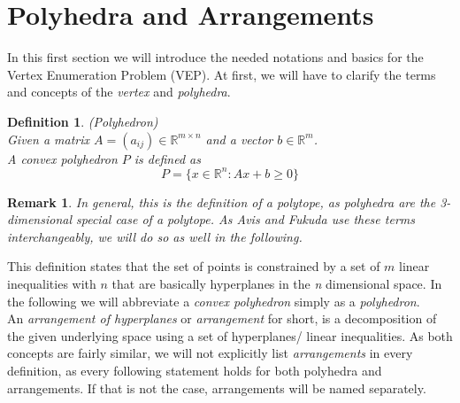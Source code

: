 \documentclass[a4paper, 11pt]{article}
\newtheorem{mydef}{Definition}
\newtheorem*{remark}{Remark}
\begin{document}
\section{Polyhedra and Arrangements}
In this first section we will introduce the needed notations and basics for the Vertex Enumeration Problem (VEP). At first, we will have to clarify the terms and concepts of the \textit{vertex} and \textit{polyhedra}.

\begin{mydef}(Polyhedron)\\
	Given a matrix $A=(a_{ij}) \in \mathbb{R}^{m\times n}$ and a vector $b \in \mathbb{R}^m$.\\
	
	A \textit{convex polyhedron} $P$ is defined as
	\begin{equation}
		P = \{ x\in \mathbb{R}^n: Ax+b\geq 0 \}
	\end{equation}
\end{mydef}
\begin{remark}
	
	In general, this is the definition of a polytope, as polyhedra are the 3-dimensional special case of a polytope. As Avis and Fukuda use these terms interchangeably, we will do so as well in the following. 
\end{remark}

This definition states that the set of points is constrained by a set of $m$ linear inequalities with $n$ that are basically hyperplanes in the \textit{n} dimensional space. In the following we will abbreviate a \textit{convex polyhedron} simply as a \textit{polyhedron}. \\

An \textit{arrangement of hyperplanes} or \textit{arrangement} for short, is a decomposition of the given underlying space using a set of hyperplanes/ linear inequalities. As both concepts are fairly similar, we will not explicitly list \textit{arrangements} in every definition, as every following statement holds for both polyhedra and arrangements. If that is not the case, arrangements will be named separately.\\
\end{document}
